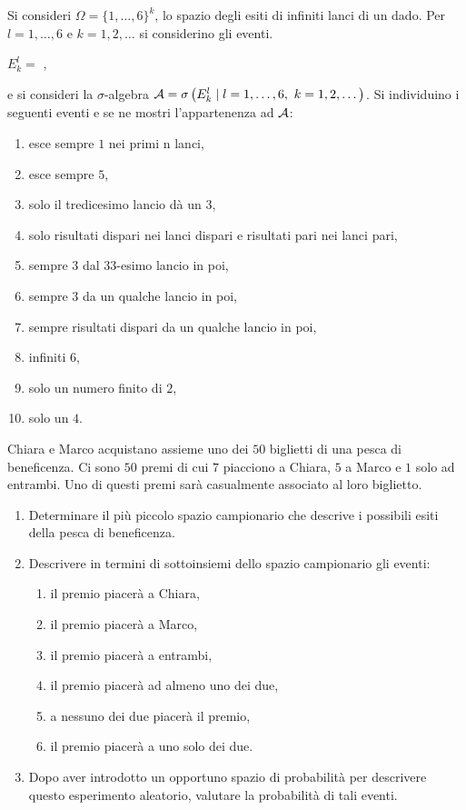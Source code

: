 Si consideri $\Omega =\{1,\dots ,6\}^{k}$, lo spazio degli esiti di infiniti lanci di un dado. Per $l=1,\dots ,6$ e $k=1,2,\dots $ si considerino gli eventi.
\begin{center}
	$E_{k}^{l} =$ ,
\end{center}
e si consideri la $\sigma $-algebra $\mathcal{A} =\sigma \left(E_{k}^{l} \mid l=1,\dots ,6,\ k=1,2,\dots \right)$. Si individuino i seguenti eventi e se ne mostri l'appartenenza ad $\mathcal{A}$:
\begin{enumerate}
	\item esce sempre $1$ nei primi n lanci,
	\item esce sempre $5$,
	\item solo il tredicesimo lancio dà un $3$,
	\item solo risultati dispari nei lanci dispari e risultati pari nei lanci pari,
	\item sempre $3$ dal $33$-esimo lancio in poi,
	\item sempre $3$ da un qualche lancio in poi,
	\item sempre risultati dispari da un qualche lancio in poi,
	\item infiniti $6$,
	\item solo un numero finito di $2$,
	\item solo un $4$.
\end{enumerate}

\Esercizio{}

Chiara e Marco acquistano assieme uno dei $50$ biglietti di una pesca di beneficenza. Ci sono $50$ premi di cui $7$ piacciono a Chiara, $5$ a Marco e $1$ solo ad entrambi. Uno di questi premi sarà casualmente associato al loro biglietto.
\begin{enumerate}
	\item Determinare il più piccolo spazio campionario che descrive i possibili esiti della pesca di beneficenza.
	\item Descrivere in termini di sottoinsiemi dello spazio campionario gli eventi:
	\begin{enumerate}
		\item il premio piacerà a Chiara,
		\item il premio piacerà a Marco,
		\item il premio piacerà a entrambi,
		\item il premio piacerà ad almeno uno dei due,
		\item a nessuno dei due piacerà il premio,
		\item il premio piacerà a uno solo dei due.
	\end{enumerate}
	\item Dopo aver introdotto un opportuno spazio di probabilità per descrivere questo esperimento aleatorio, valutare la probabilità di tali eventi.
\end{enumerate}

